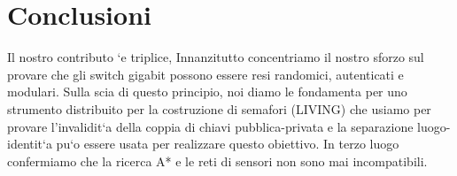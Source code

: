 \documentclass{article}
\begin{document}
\section{Conclusioni}
Il nostro contributo `e triplice, Innanzitutto concentriamo il nostro sforzo sul
provare che gli switch gigabit possono essere resi randomici, autenticati e modulari.
Sulla scia di questo principio, noi diamo le fondamenta per uno strumento
distribuito per la costruzione di semafori (LIVING) che usiamo per provare
l’invalidit`a della coppia di chiavi pubblica-privata e la separazione luogo-identit`a
pu`o essere usata per realizzare questo obiettivo. In terzo luogo confermiamo che
la ricerca A* e le reti di sensori non sono mai incompatibili.
\end{document}
